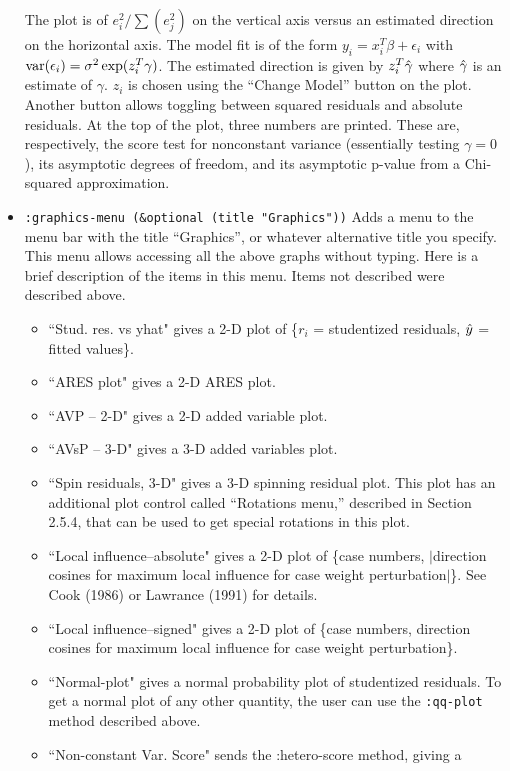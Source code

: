 \begin{itemize}
The plot is of $e_i^2/\sum (e_j^2)$ on the vertical axis versus an estimated
direction on the horizontal axis.  The model fit is of the form $y_i =
x_i^T\beta + \epsilon_i$ with $\mbox{var}(\epsilon_i) = \sigma^2\exp (z_i^T\gamma)$.
The estimated direction is given by $z_i^T\mbox{$\hat{\gamma}$}$ where $\mbox{$\hat{\gamma}$}$ is an
estimate of $\gamma$.  $z_i$ is chosen using the ``Change Model'' button on
the plot.  Another button allows toggling between squared residuals and
absolute residuals.  At the top of the plot, three numbers are printed.  These
are, respectively, the score test for nonconstant variance (essentially
testing $\gamma = 0$), its asymptotic degrees of freedom, and its asymptotic
p-value from a Chi-squared approximation.


\item {\tt :graphics-menu (\&optional (title "Graphics"))}  
Adds a menu to the menu bar with the title ``Graphics'', or whatever
alternative title you specify.  This menu
allows accessing all the above graphs without
typing.  Here is a brief description of the items in this menu.  Items not
described were described above.
\begin{itemize}
	\item ``Stud. res. vs yhat" gives a 2-D plot of \{$r_i$ = studentized
residuals, $\mbox{$\hat{y}$}$ = fitted values\}.
	\item ``ARES plot" gives a 2-D ARES plot.
	\item ``AVP -- 2-D" gives a 2-D added variable plot.
	\item ``AVsP -- 3-D" gives a 3-D added variables plot.
   \item ``Spin residuals, 3-D" gives a 3-D spinning residual plot.  This plot
has an additional plot control called ``Rotations menu,'' described in
Section 2.5.4, that can be used to get special rotations in this plot.
	\item ``Local influence--absolute" gives a 2-D plot of \{case numbers,
$\mid$direction cosines for maximum local influence for case weight
perturbation$\mid$\}.  See Cook (1986) or Lawrance (1991) for details.
	\item ``Local influence--signed" gives a 2-D plot of \{case numbers,
direction cosines for maximum local influence for case weight
perturbation\}.
	\item ``Normal-plot" gives a normal probability plot of studentized
residuals.  To get a normal plot of any other quantity, the user can use the
{\tt :qq-plot} method described above.
	\item ``Non-constant Var. Score" sends the :hetero-score method, giving a

\end{itemize}
\end{itemize}
